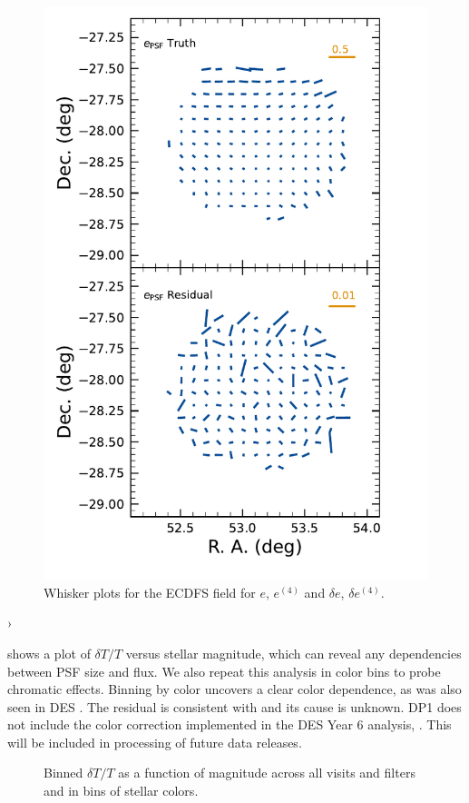 \begin{figure}[htb!]
    \includegraphics[scale=0.33]{psf_second_whisker}
    \caption{\small Whisker plots for the  \gls{ECDFS} field for $e$, $e^{(4)}$ and $\delta e$, $\delta e^{(4)}$.}
    \label{fig:psf_residuals_whisker_ECDFS}
\end{figure}›

 shows a plot of  $\delta T/T$ versus stellar magnitude, which can reveal any dependencies between \gls{PSF} size and flux.
We also repeat this analysis in color bins to probe chromatic effects.
Binning by color uncovers a clear color dependence, as was also seen in \gls{DES} \citep{DES:2020vau}.
The residual is consistent with  and its cause is unknown.
DP1 does not include the color correction implemented in the DES Year 6 analysis, \citet{2025OJAp....8E..26S}. 
This will be included in processing of future data releases.
\begin{figure}[htb!]
\caption{Binned $\delta T/T$ as a function of magnitude across all visits and filters and in bins of stellar colors.}
\label{fig:psf_residuals_mag_color}
\end{figure}

